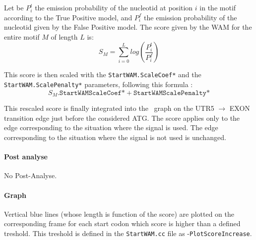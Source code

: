 Let be $P^t_i$ the emission probability of the nucleotid at position
$i$ in the motif according to the True Positive model, and $P^f_i$ the
emission probability of the nucleotid given by the False Positive
model. The score given by the WAM for the entire motif $M$ of length
$L$ is:
\[ S_M = \sum_{i=0}^{L} log\left(\frac{P^t_i}{P^f_i}\right) \]

This score is then scaled with the \texttt{StartWAM.ScaleCoef*} and the
\texttt{StartWAM.ScalePenalty*} parameters, following this formula :
$$S_M . \texttt{StartWAMScaleCoef*} + \texttt{StartWAMScalePenalty*}$$

This rescaled score is finally integrated into the \EuGene\ graph on
the UTR5 $\to$ EXON transition edge just before the considered ATG. The
score applies only to the edge corresponding to the situation where
the signal is used. The edge corresponding to the situation where the
signal is not used is unchanged.

\paragraph{Post analyse}

No Post-Analyse.

\paragraph{Graph}

Vertical blue lines (whose length is function of the score) are
plotted on the corresponding frame for each start codon which score is
higher than a defined treshold. This treshold is defined in the
\texttt{StartWAM.cc} file as -\texttt{PlotScoreIncrease}.
